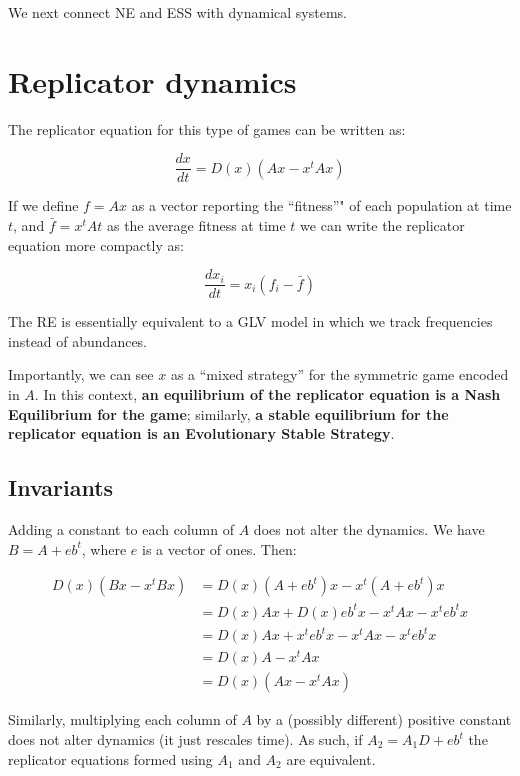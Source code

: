\documentclass[]{book}
\begin{document}
We next connect NE and ESS with dynamical systems.

\hypertarget{replicator-dynamics}{%
\section{Replicator dynamics}\label{replicator-dynamics}}

The replicator equation for this type of games can be written as:

\[
\dfrac{d x}{dt} = D(x)(A x - x^t A x)
\]

If we define \(f = A x\) as a vector reporting the ``fitness''" of each population at time \(t\), and \(\bar{f} = x^t A t\) as the average fitness at time \(t\) we can write the replicator equation more compactly as:

\[
\dfrac{d x_i}{dt} = x_i (f_i - \bar{f})
\]

The RE is essentially equivalent to a GLV model in which we track frequencies instead of abundances.

Importantly, we can see \(x\) as a ``mixed strategy'' for the symmetric game encoded in \(A\). In this context, \textbf{an equilibrium of the replicator equation is a Nash Equilibrium for the game}; similarly, \textbf{a stable equilibrium for the replicator equation is an Evolutionary Stable Strategy}.

\hypertarget{invariants}{%
\subsection{Invariants}\label{invariants}}

Adding a constant to each column of \(A\) does not alter the dynamics. We have \(B = A + e b^t\), where \(e\) is a vector of ones. Then:

\[
\begin{aligned}
D(x)(B x - x^t B x) &= D(x)(A + eb^t) x - x^t (A + eb^t) x\\
&= D(x)A x + D(x) eb^t x - x^t A x - x^t e b^t x\\
&= D(x)A x + x^t e b^t x - x^t A x - x^t e b^t  x\\
&= D(x)A - x^t A x\\
&= D(x)(A x - x^t A x)
\end{aligned}
\]

Similarly, multiplying each column of \(A\) by a (possibly different) positive constant does not alter dynamics (it just rescales time). As such, if \(A_2 = A_1 D + eb^t\) the replicator equations formed using \(A_1\) and \(A_2\) are equivalent.
\end{document}
